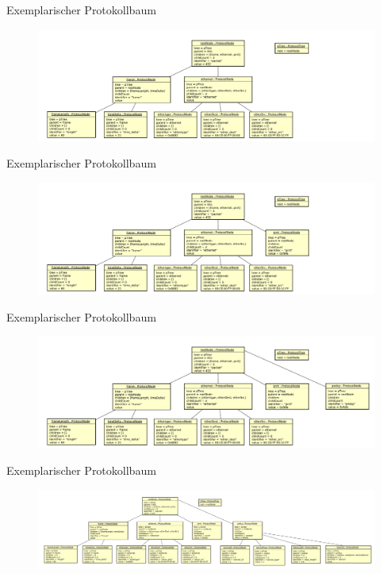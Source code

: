 \begin{frame}{Exemplarischer Protokollbaum}
    \begin{figure}
    	\centering
    	\includegraphics[width=\textwidth]{./images/prototree/baum4.pdf}
    \end{figure}
\end{frame}

\begin{frame}{Exemplarischer Protokollbaum}
    \begin{figure}
    	\centering
    	\includegraphics[width=\textwidth]{./images/prototree/baum5.pdf}
    \end{figure}
\end{frame}

\begin{frame}{Exemplarischer Protokollbaum}
    \begin{figure}
    	\centering
    	\includegraphics[width=\textwidth]{./images/prototree/baum6.pdf}
    \end{figure}
\end{frame}

\begin{frame}{Exemplarischer Protokollbaum}
    \begin{figure}
    	\centering
    	\includegraphics[width=\textwidth]{./images/prototree/baum7.pdf}
    \end{figure}
\end{frame}

